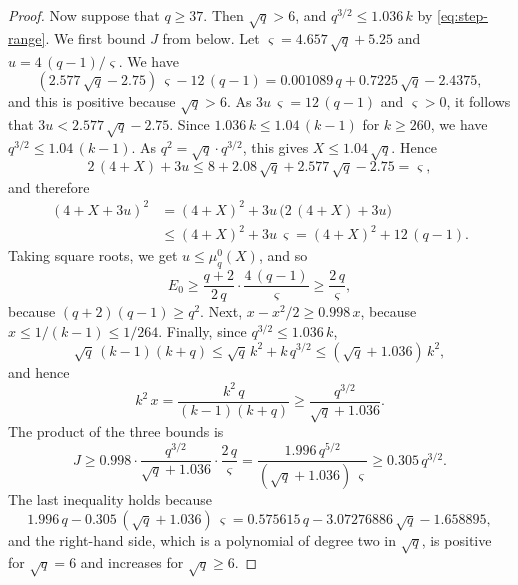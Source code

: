 \documentclass{amsart}
\theoremstyle{definition}
\theoremstyle{remark}
\numberwithin{equation}{section}
\begin{document}
\begin{proof}
Now suppose that $q\ge37$. Then $\sqrt q>6$, and
$q^{3/2}\le1.036\,k$ by \eqref{eq:step-range}. We first bound $J$ from
below. Let $\varsigma=4.657\,\sqrt q+5.25$ and $u=4\,(q-1)/\varsigma$. We
have
\[
(2.577\,\sqrt q-2.75)\,\varsigma-12\,(q-1)
=0.001089\,q+0.7225\,\sqrt q-2.4375 ,
\]
and this is positive because $\sqrt q>6$. As $3u\,\varsigma=12\,(q-1)$ and
$\varsigma>0$, it follows that $3u<2.577\,\sqrt q-2.75$. Since
$1.036\,k\le1.04\,(k-1)$ for $k\ge260$, we have
$q^{3/2}\le1.04\,(k-1)$. As $q^2=\sqrt q\cdot q^{3/2}$, this gives
$X\le1.04\,\sqrt q$. Hence
\[
2\,(4+X)+3u\le8+2.08\,\sqrt q+2.577\,\sqrt q-2.75=\varsigma ,
\]
and therefore
\begin{align*}
(4+X+3u)^2&=(4+X)^2+3u\,\bigl(2\,(4+X)+3u\bigr)\\
&\le(4+X)^2+3u\,\varsigma=(4+X)^2+12\,(q-1).
\end{align*}
Taking square roots, we get $u\le\mu^0_q(X)$, and so
\[
E_0\ge\frac{q+2}{2\,q}\cdot\frac{4\,(q-1)}{\varsigma}
\ge\frac{2\,q}{\varsigma},
\]
because $(q+2)(q-1)\ge q^2$. Next, $x-x^2/2\ge0.998\,x$, because
$x\le1/(k-1)\le1/264$. Finally, since $q^{3/2}\le1.036\,k$,
\[
\sqrt q\,(k-1)(k+q)\le\sqrt q\,k^2+k\,q^{3/2}\le(\sqrt q+1.036)\,k^2 ,
\]
and hence
\[
k^2\,x=\frac{k^2\,q}{(k-1)(k+q)}\ge\frac{q^{3/2}}{\sqrt q+1.036}.
\]
The product of the three bounds is
\[
J\ge0.998\cdot\frac{q^{3/2}}{\sqrt q+1.036}\cdot\frac{2\,q}{\varsigma}
=\frac{1.996\,q^{5/2}}{(\sqrt q+1.036)\,\varsigma}\ge0.305\,q^{3/2} .
\]
The last inequality holds because
\[
1.996\,q-0.305\,(\sqrt q+1.036)\,\varsigma
=0.575615\,q-3.07276886\,\sqrt q-1.658895 ,
\]
and the right-hand side, which is a polynomial of degree two in $\sqrt q$,
is positive for $\sqrt q=6$ and increases for $\sqrt q\ge6$.


\end{proof}
\end{document}

